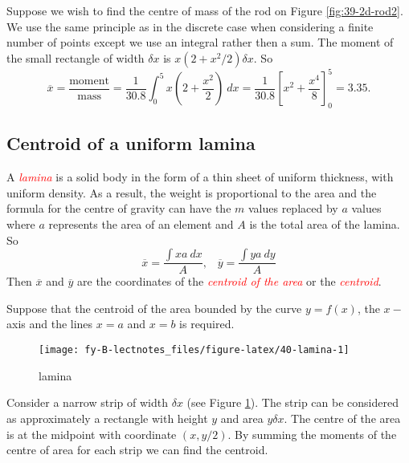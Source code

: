 \documentclass[
  11pt,
  oneside]{book}
\newcommand{\slide}{}
\theoremstyle{definition}
\theoremstyle{definition}
\theoremstyle{definition}
\theoremstyle{definition}
\theoremstyle{remark}
\begin{document}
\slide

Suppose we wish to find the centre of mass of the rod on Figure \ref{fig:39-2d-rod2}. We use the same principle as in the discrete case when considering a finite number of points except we use an integral rather then a sum. The moment of the small rectangle of width \(\delta x\) is \(x(2+x^2/2)\delta x\). So
\[
\overline x = \frac{\text{moment}}{\text{mass}} = \frac{1}{30.8}\int_0^5 x(2+\frac{x^2}{2})\ dx = \frac{1}{30.8}\left[x^2+\frac{x^4}{8}\right]_0^5 = 3.35.
\]
\slide

\subsection{Centroid of a uniform lamina}\label{centroid-of-a-uniform-lamina}

A \textcolor{red}{\em lamina} is a solid body in the form of a thin sheet of uniform thickness, with uniform density. As a result, the weight is proportional to the area and the formula for the centre of gravity can have the \(m\) values replaced by \(a\) values where \(a\) represents the area of an element and \(A\) is the total area of the lamina. So
\[
\overline x = \frac{\displaystyle\int xa\ dx}{A},\;\;\; \overline y = \frac{\displaystyle\int ya\ dy}{A}
\]
Then \(\overline x\) and \(\overline y\) are the coordinates of the \textcolor{red}{\em centroid of the area} or the \textcolor{red}{\em centroid}.

\slide

Suppose that the centroid of the area bounded by the curve \(y=f(x)\), the \(x-\)axis and the lines \(x=a\) and \(x=b\) is required.

\begin{figure}

{\centering \texttt{[image: fy-B-lectnotes\_files/figure-latex/40-lamina-1]} 

}

\caption{lamina}\label{fig:40-lamina}
\end{figure}

Consider a narrow strip of width \(\delta x\) (see Figure \ref{fig:40-lamina}). The strip can be considered as approximately a rectangle with height \(y\) and area \(y\delta x\). The centre of the area is at the midpoint with coordinate \((x,y/2)\). By summing the moments of the centre of area for each strip we can find the centroid.

\slide
\end{document}
